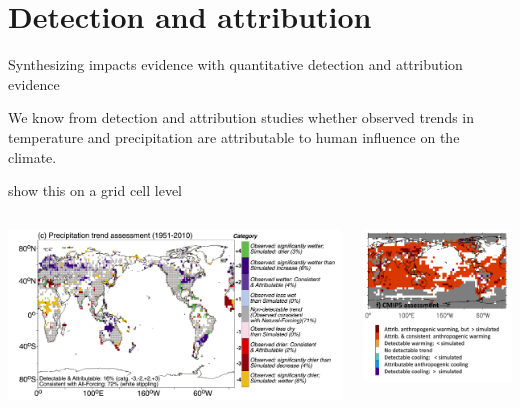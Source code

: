 \documentclass[9pt]{beamer}
\begin{document}
\section{Detection and attribution}

\begin{frame}
\tableofcontents[currentsection]
\end{frame}

\begin{frame}{Synthesizing impacts evidence with quantitative detection and attribution evidence}

We know from detection and attribution studies whether observed trends in temperature and precipitation are attributable to human influence on the climate.

\cite{Knutson2013, Knutson2018} show this on a grid cell level

\begin{columns}
	\begin{column}{0.65\linewidth}
		\includegraphics[width=\linewidth]{images/knutson_precip_da}
	\end{column}
	\begin{column}{0.35\linewidth}
		\includegraphics[width=\linewidth]{images/knutson_temp_da}
	\end{column}
\end{columns}


\end{frame}
\end{document}
